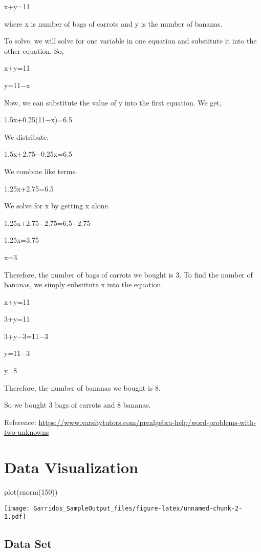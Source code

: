 \documentclass[
]{article}
\newenvironment{Shaded}{\begin{snugshade}}{\end{snugshade}}
\newcommand{\DecValTok}[1]{\textcolor[rgb]{0.00,0.00,0.81}{#1}}
\newcommand{\FunctionTok}[1]{\textcolor[rgb]{0.00,0.00,0.00}{#1}}
\newcommand{\NormalTok}[1]{#1}
\begin{document}
x+y=11

where x is number of bags of carrots and y is the number of bananas.

To solve, we will solve for one variable in one equation and substitute
it into the other equation. So,

x+y=11

y=11−x

Now, we can substitute the value of y into the first equation. We get,

1.5x+0.25(11−x)=6.5

We distribute.

1.5x+2.75−0.25x=6.5

We combine like terms.

1.25x+2.75=6.5

We solve for x by getting x alone.

1.25x+2.75−2.75=6.5−2.75

1.25x=3.75

x=3

Therefore, the number of bags of carrots we bought is 3. To find the
number of bananas, we simply substitute x into the equation.

x+y=11

3+y=11

3+y−3=11−3

y=11−3

y=8

Therefore, the number of bananas we bought is 8.

So we bought 3 bags of carrots and 8 bananas.

Reference:
\url{https://www.varsitytutors.com/prealgebra-help/word-problems-with-two-unknowns}

\hypertarget{data-visualization}{%
\section{Data Visualization}\label{data-visualization}}

\begin{Shaded}
\begin{Highlighting}[]
\FunctionTok{plot}\NormalTok{(}\FunctionTok{rnorm}\NormalTok{(}\DecValTok{150}\NormalTok{))}
\end{Highlighting}
\end{Shaded}

\texttt{[image: Garridos\_SampleOutput\_files/figure-latex/unnamed-chunk-2-1.pdf]}

\hypertarget{data-set}{%
\subsection{Data Set}\label{data-set}}
\end{document}
